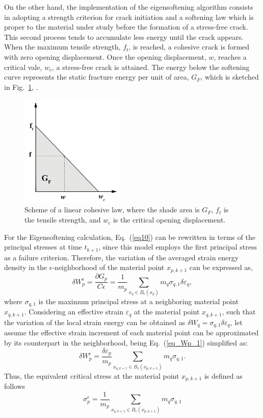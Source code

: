 \documentclass[applsci,journal,article,submit,moreauthors,pdftex]{Definitions/mdpi}
\begin{document}
On the other hand, the implementation of the eigensoftening algorithm consists in adopting a strength criterion for crack initiation and a softening law which is proper to the material under study before the formation of a stress-free crack. This second process tends to accumulate less energy until the crack appears. When the maximum tensile strength, $f_t$, is reached, a cohesive crack is formed with zero opening displacement. Once the opening displacement, $w$, reaches a critical vale, $w_c$, a stress-free crack is attained. The energy below the softening curve represents the static fracture energy per unit of area, $G_F$, which is sketched in Fig.~\ref{fig_GF}, \cite{Navas2018a}.
\begin{figure}
\centering
\includegraphics[width=0.44\textwidth]{Figs/GF.pdf}
\caption{Scheme of a linear cohesive law, where the shade area is $G_F$, $f_t$ is the tensile strength,  and $w_c$  is the critical opening displacement.}
\label{fig_GF}
\end{figure}
For the Eigensoftening calculation, Eq.~(\ref{eq10}) can be rewritten in terms of the principal stresses at time $t_{k+1}$, since this model employs the first principal stress as a failure criterion. Therefore, the variation of the averaged strain energy density in the $\epsilon$-neighborhood of the material point $x_{p, k+1}$ can be expressed as,
\begin{equation}\label{eq_Wp_1}
\delta W^\epsilon_{p} = \frac{\partial G_{p}}{C\epsilon} = \frac{1}{m_{p}}\sum_{x_{q}\in B_\epsilon (x_{p})} m_{q} \sigma_{q,1} \delta \varepsilon_q,
\end{equation}
where $\sigma_{q, 1}$ is the maximum principal stress at a neighboring material point $x_{q, k+1}$. Considering an effective strain $\varepsilon_q$ at the material point $x_{q, k+1}$, such that the variation of the local strain energy can be obtained as $\delta W_q = \sigma_{q, 1}\delta \varepsilon_q$, let assume the effective strain increment of each material point can be approximated by its counterpart in the neighborhood, being Eq.~(\ref{eq_Wp_1}) simplified as:
\begin{equation}\label{eq_Wp_3}
\delta W^\epsilon_{p}=\frac{\delta \varepsilon_p} {m_{p}} \sum_{x_{q,k+1}\in B_\epsilon (x_{p,k+1})} m_q \sigma_{q, 1}.
\end{equation}
Thus, the equivalent critical stress at the material point $x_{p, k+1}$ is defined as follows
\begin{equation}\label{eq_sigmap}
\sigma^{\epsilon}_{p}=\frac{1}{m_{p}}\sum_{x_{q,k+1}\in B_\epsilon (x_{p,k+1})}m_q \sigma_{q, 1}
\end{equation}
\end{document}
